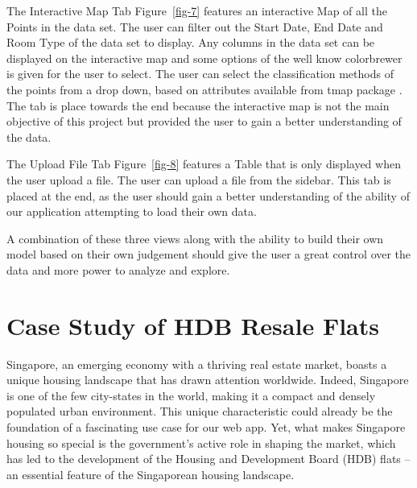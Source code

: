 \documentclass[manuscript,screen]{acmart}
\begin{document}
The Interactive Map Tab Figure~\ref{fig-7} features an interactive Map
of all the Points in the data set. The user can filter out the Start
Date, End Date and Room Type of the data set to display. Any columns in
the data set can be displayed on the interactive map and some options of
the well know colorbrewer \citep{colorbrewer} is given for the user to
select. The user can select the classification methods of the points
from a drop down, based on attributes available from tmap package
\citep{tmap}. The tab is place towards the end because the interactive
map is not the main objective of this project but provided the user to
gain a better understanding of the data.

The Upload File Tab Figure~\ref{fig-8} features a Table that is only
displayed when the user upload a file. The user can upload a file from
the sidebar. This tab is placed at the end, as the user should gain a
better understanding of the ability of our application attempting to
load their own data.

A combination of these three views along with the ability to build their
own model based on their own judgement should give the user a great
control over the data and more power to analyze and explore.

\hypertarget{case-study-of-hdb-resale-flats}{%
\section{\texorpdfstring{\textbf{Case Study of HDB Resale
Flats}}{Case Study of HDB Resale Flats}}\label{case-study-of-hdb-resale-flats}}

Singapore, an emerging economy with a thriving real estate market,
boasts a unique housing landscape that has drawn attention worldwide.
Indeed, Singapore is one of the few city-states in the world, making it
a compact and densely populated urban environment. This unique
characteristic could already be the foundation of a fascinating use case
for our web app. Yet, what makes Singapore housing so special is the
government's active role in shaping the market, which has led to the
development of the Housing and Development Board (HDB) flats -- an
essential feature of the Singaporean housing landscape.~
\end{document}
